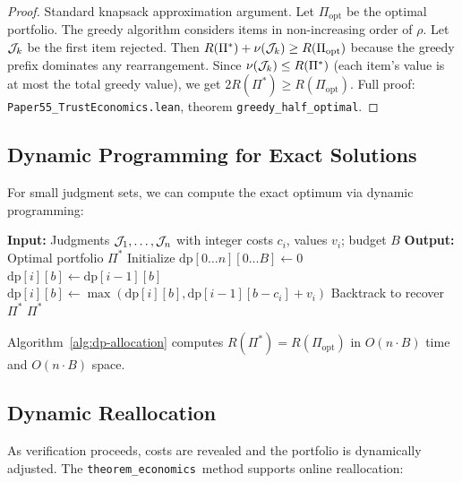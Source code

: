 \documentclass[11pt]{article}
\newcommand{\TrustValue}{\nu}
\newcommand{\TrustReturn}{\rho}
\newcommand{\ThmEcon}{\texttt{theorem\_economics}}
\begin{document}
\begin{proof}
Standard knapsack approximation argument.  Let $\Pi_{\text{opt}}$ be
the optimal portfolio.  The greedy algorithm considers items in
non-increasing order of $\TrustReturn$.  Let $\mathcal{J}_k$ be the first
item rejected.  Then $R(\Pi^*) + \TrustValue(\J_k) \geq
R(\Pi_{\text{opt}})$ because the greedy prefix dominates any
rearrangement.  Since $\TrustValue(\J_k) \leq R(\Pi^*)$ (each item's
value is at most the total greedy value), we get $2 R(\Pi^*) \geq
R(\Pi_{\text{opt}})$.  Full proof:
\texttt{Paper55\_TrustEconomics.lean}, theorem
\texttt{greedy\_half\_optimal}.
\end{proof}

\subsection{Dynamic Programming for Exact Solutions}

For small judgment sets, we can compute the exact optimum via
dynamic programming:

\begin{algorithm}[H]
\caption{Exact Allocation via Dynamic Programming}
\label{alg:dp-allocation}
\begin{algorithmic}[1]
\STATE \textbf{Input:} Judgments $\mathcal{J}_1, \ldots, \mathcal{J}_n$ with integer
       costs $c_i$, values $v_i$; budget $B$
\STATE \textbf{Output:} Optimal portfolio $\Pi^*$
\STATE Initialize $\mathrm{dp}[0 \ldots n][0 \ldots B] \gets 0$
    \STATE $\mathrm{dp}[i][b] \gets \mathrm{dp}[i-1][b]$
      \STATE $\mathrm{dp}[i][b] \gets \max(\mathrm{dp}[i][b],
             \mathrm{dp}[i-1][b - c_i] + v_i)$
    \ENDIF
  \ENDFOR
\ENDFOR
\STATE Backtrack to recover $\Pi^*$
\RETURN $\Pi^*$
\end{algorithmic}
\end{algorithm}

\begin{proposition}[DP Optimality]\label{prop:dp-optimal}
Algorithm~\ref{alg:dp-allocation} computes $R(\Pi^*) =
R(\Pi_{\text{opt}})$ in $O(n \cdot B)$ time and $O(n \cdot B)$ space.
\end{proposition}

\subsection{Dynamic Reallocation}
As verification proceeds, costs are revealed and the portfolio is
dynamically adjusted.  The \ThmEcon\ method supports online
reallocation:
\end{document}
